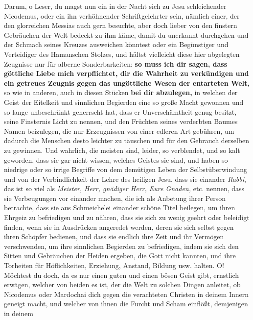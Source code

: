 Darum, o Leser, du magst nun ein in der Nacht sich zu Jesu schleichender
Nicodemus, oder ein ihn verhöhnender Schriftgelehrter
sein, nämlich einer, der
den glorreichen Messias auch gern besuchte, aber doch lieber von den finstern
Gebräuchen der Welt bedeckt zu ihm käme, damit du unerkannt durchgehen und der
Schmach seines Kreuzes ausweichen könntest oder ein Begünstiger und Verteidiger
des Hamanschen
Stolzes, und hältst vielleicht diese hier abgelegten
Zeugnisse
nur für alberne Sonderbarkeiten: \textbf{so muss ich dir sagen, dass göttliche
Liebe mich
verpflichtet, dir die Wahrheit zu verkündigen und ein getreues
Zeugnis gegen das
ungöttliche Wesen der entarteten Welt,} so wie in anderen, auch in diesen
Stücken
\textbf{bei dir abzulegen,} in welchen der Geist der Eitelkeit und sinnlichen
Begierden
eine so große Macht gewonnen und so lange unbeschränkt geherrscht hat, dass er
Unverschämtheit genug besitzt, seine Finsternis Licht zu nennen, und den
Früchten seines verderbten Baumes Namen beizulegen, die nur Erzeugnissen von
einer edleren Art gebühren, um dadurch die Menschen desto leichter zu täuschen
und für den Gebrauch derselben zu gewinnen. Und wahrlich, die meisten sind,
leider, so verblendet, und so kalt geworden, dass sie gar nicht wissen,
welches Geistes sie sind, und haben so niedrige oder so irrige Begriffe von dem
demütigen Leben der Selbstüberwindung und
von der Verbindlichkeit der Lehre des
heiligen Jesu, dass sie einander \textit{Rabbi}, das ist so viel als
\textit{Meister,
Herr, gnädiger Herr, Eure Gnaden,} etc. nennen, dass sie Verbeugungen vor
einander machen, die ich als Anbetung ihrer Person betrachte, dass sie aus
Schmeichelei einander schöne Titel beilegen, um ihren Ehrgeiz zu befriedigen und
zu nähren, dass sie sich zu wenig geehrt oder beleidigt finden, wenn sie in
Ausdrücken angeredet werden, deren sie sich selbst gegen ihren Schöpfer
bedienen, und dass sie endlich ihre Zeit und ihr Vermögen verschwenden, um ihre
sinnlichen Begierden zu befriedigen, indem sie sich den Sitten und Gebräuchen
der Heiden ergeben, die Gott nicht kannten, und ihre Torheiten für
Höflichkeiten, Erziehung, Anstand, Bildung usw. halten. O! Möchtest
du doch, da es nur einen guten und einen bösen Geist gibt, ernstlich erwägen,
welcher von beiden es ist, der die Welt zu solchen Dingen anleitet, ob Nicodemus
oder Mardochai dich gegen die verachteten Christen in
deinem Innern geneigt
macht, und welcher von ihnen die Furcht und Scham einflößt, demjenigen in deinem
